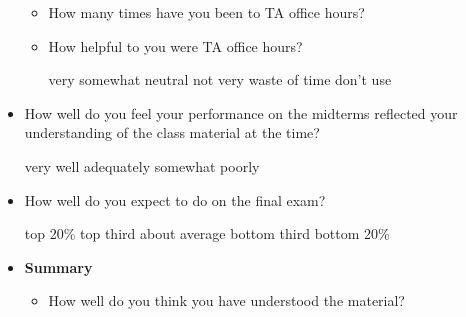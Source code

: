 \documentclass[handout]{mcs}
\begin{document}
\begin{itemize}
\begin{itemize}
\item How many times have you been to TA office hours?\brule{0.7in}

\item How helpful to you were TA office hours?
 
\begin{center}
very\hspace{0.3in} somewhat \hspace{0.3in} neutral\hspace{0.3in} not
very \hspace{0.3in} waste of time  \hspace{0.7in}don't use
\end{center}

\end{itemize}



\item How well do you feel your performance on the midterms
  reflected your understanding of the class material at the time?

\begin{center}
very well\hspace{0.3in} adequately\hspace{0.3in} somewhat\hspace{0.3in} poorly
\end{center}

\item How well do you expect to do on the final exam?

\begin{center}
top 20\%\hspace{0.3in} top third \hspace{0.3in} about average\hspace{0.3in}  bottom third \hspace{0.3in} 
 bottom 20\%
\end{center}


\iffalse

\item \textbf{Summary}

\begin{itemize}
\item How well do you think you have understood the material?


\end{itemize}
\end{itemize}
\end{document}
